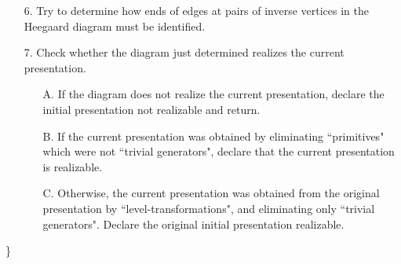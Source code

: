 \documentclass[12pt]{amsart}
\begin{document}
\begin{enumerate}
    \item[6.]  Try to determine how ends of edges at pairs of inverse vertices in the Heegaard
      diagram must be identified.
    \item[7.]  Check whether the diagram just determined realizes the current presentation.
      \begin{enumerate}
      \item[A.]  If the diagram does not realize the current presentation, declare the initial
        presentation not realizable and return.
      \item[B.]  If the current presentation was obtained by eliminating  ``primitives" which were
        not  ``trivial generators", declare that the current presentation is realizable.
      \item[C.]   Otherwise, the current presentation was obtained from the original presentation
        by  ``level-transformations", and eliminating only  ``trivial generators". Declare
        the original initial presentation realizable.
        \end{enumerate}
      \end{enumerate}
\}
\end{document}
